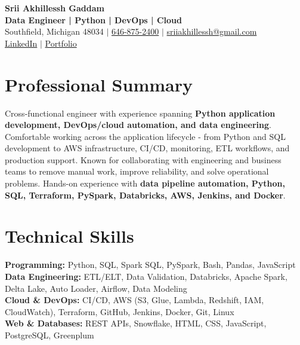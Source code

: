 \documentclass[letterpaper,10pt]{article}
\begin{document}
\fontsize{9.35pt}{10.45pt}\selectfont

\begin{center}
    {\LARGE \textbf{Srii Akhillessh Gaddam}} \\[-1pt]
    \textbf{Data Engineer | Python | DevOps | Cloud} \\[2pt]
    Southfield, Michigan 48034 $|$
    \href{tel:6468752400}{646-875-2400} $|$
    \href{mailto:sriiakhillessh@gmail.com}{sriiakhillessh@gmail.com} \\[1pt]
    \href{https://www.linkedin.com/in/srii-akhiilessh-gaddam-b48668191/}{LinkedIn} $|$
    \href{https://sriiakhillesshg.github.io/portfolio/}{Portfolio}
\end{center}
\vspace{-8pt}

\section{Professional Summary}
\small{Cross-functional engineer with experience spanning \textbf{Python application development, DevOps/cloud automation, and data engineering}. Comfortable working across the application lifecycle - from Python and SQL development to AWS infrastructure, CI/CD, monitoring, ETL workflows, and production support. Known for collaborating with engineering and business teams to remove manual work, improve reliability, and solve operational problems. Hands-on experience with \textbf{data pipeline automation, Python, SQL, Terraform, PySpark, Databricks, AWS, Jenkins, and Docker}.}

\section{Technical Skills}
\small{
\textbf{Programming:} Python, SQL, Spark SQL, PySpark, Bash, Pandas, JavaScript \\
\textbf{Data Engineering:} ETL/ELT, Data Validation, Databricks, Apache Spark, Delta Lake, Auto Loader, Airflow, Data Modeling \\
\textbf{Cloud \& DevOps:} CI/CD, AWS (S3, Glue, Lambda, Redshift, IAM, CloudWatch), Terraform, GitHub, Jenkins, Docker, Git, Linux \\
\textbf{Web \& Databases:} REST APIs, Snowflake, HTML, CSS, JavaScript, PostgreSQL, Greenplum
}

\end{document}

